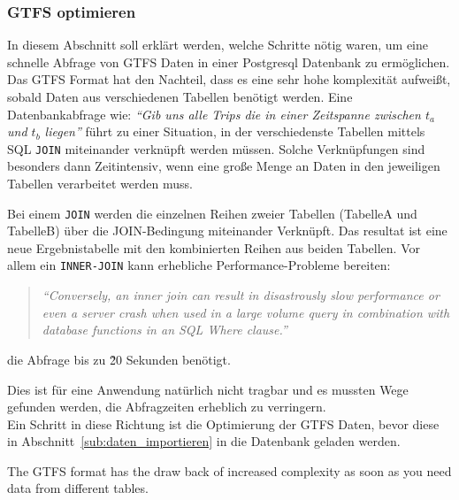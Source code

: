 \subsubsection{GTFS optimieren}
\label{ssub:gtfs_optimieren}
  In diesem Abschnitt soll erklärt werden, welche Schritte nötig waren, um eine schnelle Abfrage von GTFS Daten in einer Postgresql Datenbank zu ermöglichen.\\

  Das GTFS Format hat den Nachteil, dass es eine sehr hohe komplexität aufweißt, sobald Daten aus verschiedenen Tabellen benötigt werden. Eine Datenbankabfrage wie: \textit{"`Gib uns alle Trips die in einer Zeitspanne zwischen $t_a$ und $t_b$ liegen"'} führt zu einer Situation, in der verschiedenste Tabellen mittels SQL \texttt{JOIN} miteinander verknüpft werden müssen. Solche Verknüpfungen sind besonders dann Zeitintensiv, wenn eine große Menge an Daten in den jeweiligen Tabellen verarbeitet werden muss.

  Bei einem \texttt{JOIN} werden die einzelnen Reihen zweier Tabellen (TabelleA und TabelleB) über die JOIN-Bedingung miteinander Verknüpft. Das resultat ist eine neue Ergebnistabelle mit den kombinierten Reihen aus beiden Tabellen. Vor allem ein \texttt{INNER-JOIN} kann erhebliche Performance-Probleme bereiten:

  \begin{quote}
    \textit{"`Conversely, an inner join can result in disastrously slow performance or even a server crash when used in a large volume query in combination with database functions in an SQL Where clause."'}\parencite{wikipedia_sql_join}
  \end{quote} 

  die Abfrage bis zu \~20 Sekunden benötigt.

  
  Dies ist für eine Anwendung natürlich nicht tragbar und es mussten Wege gefunden werden, die Abfragzeiten erheblich zu verringern.\\

  Ein Schritt in diese Richtung ist die Optimierung der GTFS Daten, bevor diese in Abschnitt~\ref{sub:daten_importieren} in die Datenbank geladen werden.

  The GTFS format has the draw back of increased complexity as soon as you need data from different tables.

